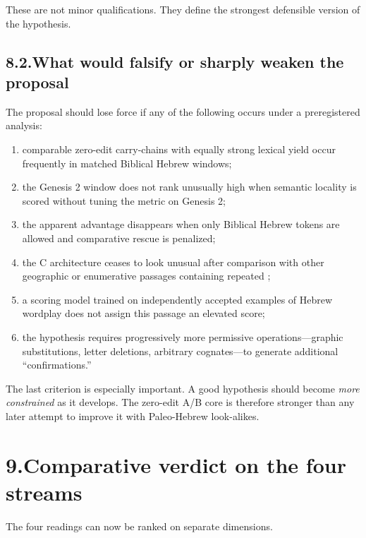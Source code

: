 These are not minor qualifications.  They define the strongest defensible version of the hypothesis.

\subsection*{8.2.\quad What would falsify or sharply weaken the proposal}

The proposal should lose force if any of the following occurs under a preregistered analysis:

\begin{enumerate}
\item comparable zero-edit carry-chains with equally strong lexical yield occur frequently in matched Biblical Hebrew windows;
\item the Genesis 2 window does not rank unusually high when semantic locality is scored without tuning the metric on Genesis 2;
\item the apparent advantage disappears when only Biblical Hebrew tokens are allowed and comparative rescue is penalized;
\item the C architecture ceases to look unusual after comparison with other geographic or enumerative passages containing repeated ;
\item a scoring model trained on independently accepted examples of Hebrew wordplay does not assign this passage an elevated score;
\item the hypothesis requires progressively more permissive operations---graphic substitutions, letter deletions, arbitrary cognates---to generate additional ``confirmations.''
\end{enumerate}

The last criterion is especially important.  A good hypothesis should become \emph{more constrained} as it develops.  The zero-edit A/B core is therefore stronger than any later attempt to improve it with Paleo-Hebrew look-alikes.

\section*{9.\quad Comparative verdict on the four streams}

The four readings can now be ranked on separate dimensions.


